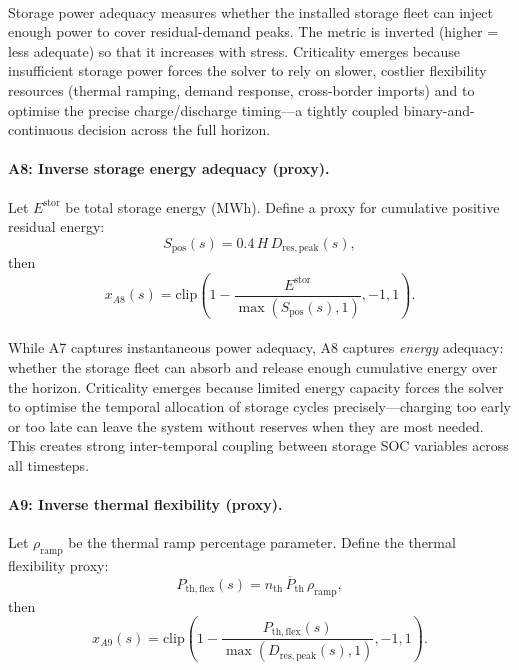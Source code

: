 \documentclass{article}
\begin{document}
\paragraph{}Storage power adequacy measures whether the installed storage fleet can inject enough power to cover residual-demand peaks. The metric is inverted (higher = less adequate) so that it increases with stress. Criticality emerges because insufficient storage power forces the solver to rely on slower, costlier flexibility resources (thermal ramping, demand response, cross-border imports) and to optimise the precise charge/discharge timing---a tightly coupled binary-and-continuous decision across the full horizon.

\paragraph{A8: Inverse storage energy adequacy (proxy).}
Let $E^{\mathrm{stor}}$ be total storage energy (MWh). Define a proxy for cumulative positive residual energy:
\begin{equation}
S_{\mathrm{pos}}(s)=0.4\,H\,D_{\mathrm{res,peak}}(s),
\end{equation}
then
\begin{equation}
x_{A8}(s)=\mathrm{clip}\!\left(1-\frac{E^{\mathrm{stor}}}{\max\!\left(S_{\mathrm{pos}}(s),1\right)},-1,1\right).
\end{equation}

\paragraph{}While A7 captures instantaneous power adequacy, A8 captures \emph{energy} adequacy: whether the storage fleet can absorb and release enough cumulative energy over the horizon. Criticality emerges because limited energy capacity forces the solver to optimise the temporal allocation of storage cycles precisely---charging too early or too late can leave the system without reserves when they are most needed. This creates strong inter-temporal coupling between storage SOC variables across all timesteps.

\paragraph{A9: Inverse thermal flexibility (proxy).}
Let $\rho_{\mathrm{ramp}}$ be the thermal ramp percentage parameter. Define the thermal flexibility proxy:
\begin{equation}
P_{\mathrm{th,flex}}(s)=n_{\mathrm{th}}\,\overline{P}_{\mathrm{th}}\,\rho_{\mathrm{ramp}},
\end{equation}
then
\begin{equation}
x_{A9}(s)=\mathrm{clip}\!\left(1-\frac{P_{\mathrm{th,flex}}(s)}{\max\!\left(D_{\mathrm{res,peak}}(s),1\right)},-1,1\right).
\end{equation}
\end{document}
